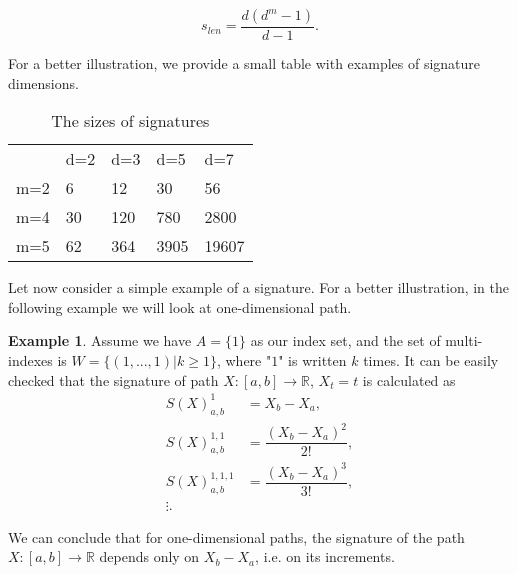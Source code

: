 \documentclass[12pt,a4paper]{report}
\theoremstyle{definition}
\newtheorem{example}{Example}
\begin{document}
\begin{equation} \label{sig_len_formula}
	s_{len}=\dfrac{d(d^m-1)}{d-1}.
\end{equation}

For a better illustration, we provide a small table with examples of signature dimensions.

\begin{table}[htb]
	\centering
	\begin{tabular}{l|l|l|l|l}
		& \textcolor[rgb]{0.2,0.2,0.2}{d=2} & \textcolor[rgb]{0.2,0.2,0.2}{d=3} & \textcolor[rgb]{0.2,0.2,0.2}{d=5} & \textcolor[rgb]{0.2,0.2,0.2}{d=7}  \\
		\textcolor[rgb]{0.2,0.2,0.2}{m=2} & 6                                 & 12                                & 30                                & 56                                 \\
		\textcolor[rgb]{0.2,0.2,0.2}{m=4} & 30                                & 120                               & 780                               & 2800                               \\
		\textcolor[rgb]{0.2,0.2,0.2}{m=5} & 62                                & 364                               & 3905                              & 19607                             
	\end{tabular}
	\caption{The sizes of signatures}
	\label{SignatureSize}
\end{table}

Let now consider a simple example of a signature. For a better illustration, in the following example we will look at one-dimensional path. 

\begin{example}
	Assume we have $A =\{1\}$ as our index set, and the set of multi-indexes is $W=\{(1,...,1)| k\geq1\}$, where "$1$" is written $k$ times. It can be easily checked that the signature of path $X:[a,b]\rightarrow \mathbb{R}$, $X_t=t$ is calculated as
	\begin{equation}	
			\begin{aligned}
			S(X)_{a,b}^{1}&=X_b-X_a, \\ 
			S(X)_{a,b}^{1,1}&=\dfrac{(X_b-X_a)^2}{2!},\\
			S(X)_{a,b}^{1,1,1}&=\dfrac{(X_b-X_a)^3}{3!},\\ 
			\vdots .			
			\end{aligned}	
	\end{equation}	
\end{example}

We can conclude that for one-dimensional paths, the signature of the path $X:[a,b]\rightarrow\mathbb{R}$ depends only on $X_b-X_a$, i.e. on its increments.
\end{document}
